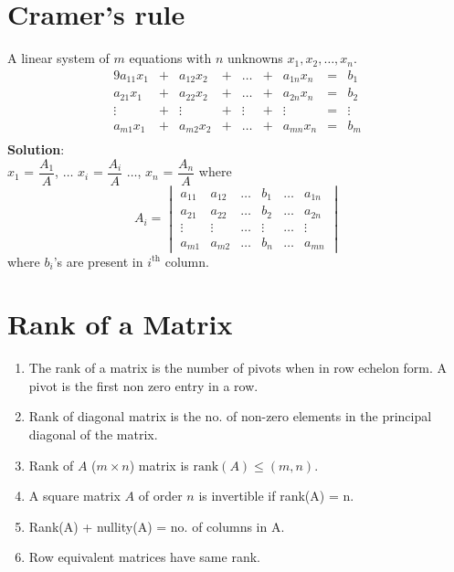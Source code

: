 \documentclass[a4paper,oneside]{book}
\begin{document}
\section{Cramer's rule}
A linear system of $m$ equations with $n$ unknowns $x_1, x_2, \ldots, x_n$.
\begin{alignat*}{9}
a_{11}x_1 & {}+{} &  a_{12}x_2 & {}+{} & \ldots & {}+{} & a_{1n}x_n & {}={} & b_1 \\
a_{21}x_1 & {}+{} &  a_{22}x_2 & {}+{} & \ldots & {}+{} & a_{2n}x_n & {}={} &  b_2 \\
\vdots    & {}+{} &  \vdots    & {}+{} & \vdots & {}+{} & \vdots    & {}={} &  \vdots \\
a_{m1}x_1 & {}+{} &  a_{m2}x_2 & {}+{} & \ldots & {}+{} & a_{mn}x_n & {}={} & b_m \\
\end{alignat*}
\textbf{Solution}:\\
$x_1$ = $\dfrac{A_1}{A}$, $\ldots$ $x_i$ = $\dfrac{A_i}{A}$ $\ldots$, $x_n$ = $\dfrac{A_n}{A}$ where 
$$ A_i = \begin{vmatrix}
a_{11} & a_{12} & \ldots & b_1 & \ldots & a_{1n} \\
a_{21} & a_{22} & \ldots & b_2 & \ldots & a_{2n} \\
\vdots & \vdots & \ldots & \vdots & \ldots & \vdots \\
a_{m1} & a_{m2} & \ldots & b_n & \ldots & a_{mn}
\end{vmatrix}$$
where $b_i$'s are present in $i^{\text{th}}$ column.
\section{Rank of a Matrix}
\begin{enumerate}
\item The rank of a matrix is the number of pivots when in row echelon form. A pivot is the first non zero entry in a row.
\item Rank of diagonal matrix is the no. of non-zero elements in the principal diagonal of the matrix.
\item Rank of $A$ ($m \times n$) matrix is $\text{rank}(A) \le (m, n)$.
\item A square matrix $A$ of order $n$ is invertible if rank(A) = n.
\item Rank(A) + nullity(A) = no. of columns in A.
\item Row equivalent matrices have same rank.
\end{enumerate}
\end{document}
